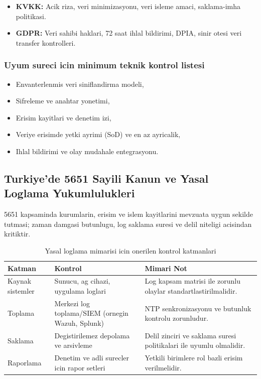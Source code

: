 \begin{itemize}
    \item \textbf{KVKK:} Acik riza, veri minimizasyonu, veri isleme amaci, saklama-imha politikasi.
    \item \textbf{GDPR:} Veri sahibi haklari, 72 saat ihlal bildirimi, DPIA, sinir otesi veri transfer kontrolleri.
\end{itemize}

\subsubsection{Uyum sureci icin minimum teknik kontrol listesi}
\begin{itemize}
    \item Envanterlenmis veri siniflandirma modeli,
    \item Sifreleme ve anahtar yonetimi,
    \item Erisim kayitlari ve denetim izi,
    \item Veriye erisimde yetki ayrimi (SoD) ve en az ayricalik,
    \item Ihlal bildirimi ve olay mudahale entegrasyonu.
\end{itemize}

\subsection{Turkiye'de 5651 Sayili Kanun ve Yasal Loglama Yukumlulukleri}
5651 kapsaminda kurumlarin, erisim ve islem kayitlarini mevzuata uygun sekilde tutmasi;
zaman damgasi butunlugu, log saklama suresi ve delil niteligi acisindan kritiktir.

\begin{table}[htbp]
\centering
\caption{Yasal loglama mimarisi icin onerilen kontrol katmanlari}
\begin{tabular}{|p{3.4cm}|p{5.2cm}|p{5.4cm}|}
\hline
\textbf{Katman} & \textbf{Kontrol} & \textbf{Mimari Not} \\
\hline
Kaynak sistemler & Sunucu, ag cihazi, uygulama loglari & Log kapsam matrisi ile zorunlu olaylar standartlastirilmalidir. \\
\hline
Toplama & Merkezi log toplama/SIEM (ornegin Wazuh, Splunk) & NTP senkronizasyonu ve butunluk kontrolu zorunludur. \\
\hline
Saklama & Degistirilemez depolama ve arsivleme & Delil zinciri ve saklama suresi politikalari ile uyumlu olmalidir. \\
\hline
Raporlama & Denetim ve adli surecler icin rapor setleri & Yetkili birimlere rol bazli erisim verilmelidir. \\
\hline
\end{tabular}
\end{table}


